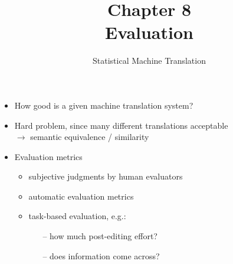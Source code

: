 \documentclass[landscape]{slides}
\begin{document}
\title[Chapter 8: Evaluation]{Chapter 8\\[1cm] Evaluation}
\author[Philipp Koehn]{}
\date{Statistical Machine Translation}

\maketitle


\vspace{10mm}
\begin{itemize}
\item How good is a given machine translation system?
\item Hard problem, since many different translations acceptable\\
$\rightarrow$ semantic equivalence / similarity
\item Evaluation metrics
\begin{itemize}
\item subjective judgments by human evaluators
\item automatic evaluation metrics
\item task-based evaluation, e.g.:
\begin{itemize}
\item[--] how much post-editing effort?
\item[--] does information come across? 
\end{itemize}
\end{itemize}
\end{itemize}

\end{document}
